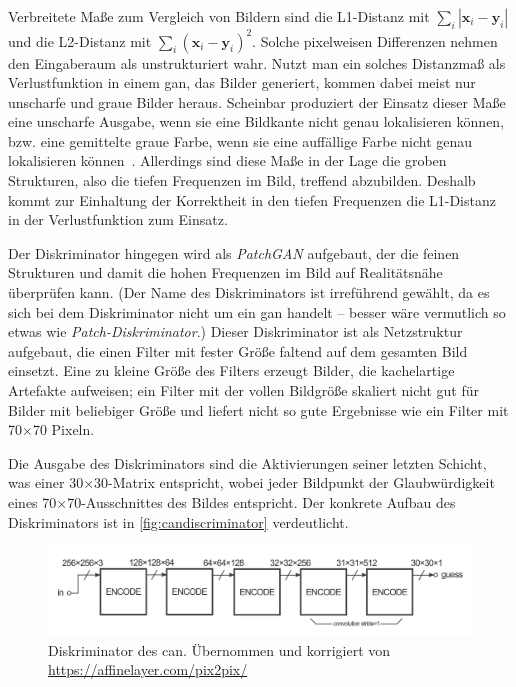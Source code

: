 Verbreitete Maße zum Vergleich von Bildern sind die L1-Distanz mit $ \sum_i | \mathbf{x}_i - \mathbf{y}_i | $ und die L2-Distanz mit $ \sum_i (\mathbf{x}_i - \mathbf{y}_i)^2 $.
Solche pixelweisen Differenzen nehmen den Eingaberaum als unstrukturiert wahr.
Nutzt man ein solches Distanzmaß als Verlustfunktion in einem \gls{gan}, das Bilder generiert, kommen dabei meist nur unscharfe und graue Bilder heraus.
Scheinbar produziert der Einsatz dieser Maße eine unscharfe Ausgabe, wenn sie eine Bildkante nicht genau lokalisieren können, bzw. eine gemittelte graue Farbe, wenn sie eine auffällige Farbe nicht genau lokalisieren können~\cite{Isola.2017}.
Allerdings sind diese Maße in der Lage die groben Strukturen, also die tiefen Frequenzen im Bild, treffend abzubilden.
Deshalb kommt zur Einhaltung der Korrektheit in den tiefen Frequenzen die L1-Distanz in der Verlustfunktion zum Einsatz.

Der Diskriminator hingegen wird als \emph{PatchGAN} aufgebaut, der die feinen Strukturen und damit die hohen Frequenzen im Bild auf Realitätsnähe überprüfen kann.
(Der Name des Diskriminators ist irreführend gewählt, da es sich bei dem Diskriminator nicht um ein \gls{gan} handelt -- besser wäre vermutlich so etwas wie \emph{Patch-Diskriminator}.)
Dieser Diskriminator ist als Netzstruktur aufgebaut, die einen Filter mit fester Größe faltend auf dem gesamten Bild einsetzt.
Eine zu kleine Größe des Filters erzeugt Bilder, die kachelartige Artefakte aufweisen; ein Filter mit der vollen Bildgröße skaliert nicht gut für Bilder mit beliebiger Größe und liefert nicht so gute Ergebnisse wie ein Filter mit 70$\times$70 Pixeln.

Die Ausgabe des Diskriminators sind die Aktivierungen seiner letzten Schicht, was einer 30$\times$30-Matrix entspricht, wobei jeder Bildpunkt der Glaubwürdigkeit eines 70$\times$70-Ausschnittes des Bildes entspricht.
Der konkrete Aufbau des Diskriminators ist in \autoref{fig:candiscriminator} verdeutlicht.

\begin{figure}
	\centering
	\includegraphics[width=0.9\linewidth]{img/can_discriminator}
	\caption[Diskriminator des \gls{can}.]{Diskriminator des \gls{can}. Übernommen und korrigiert von \url{https://affinelayer.com/pix2pix/}}
	\label{fig:candiscriminator}
\end{figure}

